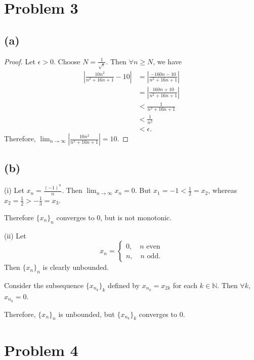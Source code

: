\documentclass{article}
\newcommand{\N}{\mathbb{N}} %
\begin{document}
\section*{Problem 3}
\subsection*{(a)}
\begin{proof}
	Let $\epsilon > 0$. Choose $N = \frac{1}{\sqrt{\epsilon}}$. Then $\forall n \geq N$, we have
	\begin{align}
		\left|\frac{10n^2}{n^2 + 16n + 1} - 10\right| &= \left|\frac{-160n - 10}{n^2 + 16n + 1}\right| \\
		&= \left|\frac{160n + 10}{n^2 + 16n + 1}\right| \\
		&< \frac{1}{n^2 + 16n + 1} \\
		&< \frac{1}{n^2} \\
		&< \epsilon.
	\end{align}
	Therefore, $\lim_{n \to \infty} \left|\frac{10n^2}{n^2 + 16n + 1}\right| = 10$.
\end{proof}

\subsection*{(b)}
(i) Let $x_n = \frac{(-1)^n}{n}$. Then $\lim_{n \to \infty} x_n = 0$. But $x_1 = -1 < \frac{1}{2} = x_2$, whereas $x_2 = \frac{1}{2} > -\frac{1}{3} = x_3$. 

Therefore $\{x_n\}_n$ converges to $0$, but is not monotonic.

(ii) Let 
\begin{equation}
	x_n = \begin{cases}
		0, \quad n \textrm{ even} \\
		n, \quad n \textrm{ odd}.
	\end{cases}
\end{equation}
Then $\{x_n\}_n$ is clearly unbounded.

Consider the subsequence $\{x_{n_k}\}_k$ defined by $x_{n_k} = x_{2k}$ for each $k \in \N$. Then $\forall k$, $x_{n_k} = 0$.

Therefore, $\{x_n\}_n$ is unbounded, but $\{x_{n_k}\}_k$ converges to $0$. 
\section*{Problem 4}
\end{document}
